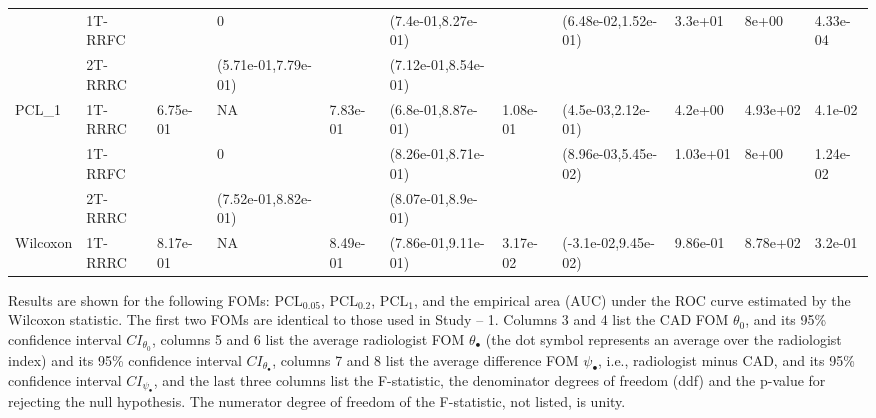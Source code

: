 \documentclass[
]{article}
\begin{document}
\begin{table}[H]
{\begin{tabular}[t]{lllllllllll}
\cmidrule{1-11}
 & 1T-RRFC &  & 0 &  & (7.4e-01,8.27e-01) &  & (6.48e-02,1.52e-01) & 3.3e+01 & 8e+00 & 4.33e-04\\
\cmidrule{2-2}
\cmidrule{4-4}
\cmidrule{6-6}
\cmidrule{8-11}
 & 2T-RRRC &  & (5.71e-01,7.79e-01) &  & (7.12e-01,8.54e-01) &  &  &  &  & \\
\cmidrule{2-2}
\cmidrule{4-4}
\cmidrule{6-6}
\multirow{-3}{*}{\raggedright\arraybackslash PCL\_1} & 1T-RRRC & \multirow{-3}{*}{\raggedright\arraybackslash 6.75e-01} & NA & \multirow{-3}{*}{\raggedright\arraybackslash 7.83e-01} & (6.8e-01,8.87e-01) & \multirow{-3}{*}{\raggedright\arraybackslash 1.08e-01} & \multirow{-2}{*}{\raggedright\arraybackslash (4.5e-03,2.12e-01)} & \multirow{-2}{*}{\raggedright\arraybackslash 4.2e+00} & \multirow{-2}{*}{\raggedright\arraybackslash 4.93e+02} & \multirow{-2}{*}{\raggedright\arraybackslash 4.1e-02}\\
\cmidrule{1-11}
 & 1T-RRFC &  & 0 &  & (8.26e-01,8.71e-01) &  & (8.96e-03,5.45e-02) & 1.03e+01 & 8e+00 & 1.24e-02\\
\cmidrule{2-2}
\cmidrule{4-4}
\cmidrule{6-6}
\cmidrule{8-11}
 & 2T-RRRC &  & (7.52e-01,8.82e-01) &  & (8.07e-01,8.9e-01) &  &  &  &  & \\
\cmidrule{2-2}
\cmidrule{4-4}
\cmidrule{6-6}
\multirow{-3}{*}{\raggedright\arraybackslash Wilcoxon} & 1T-RRRC & \multirow{-3}{*}{\raggedright\arraybackslash 8.17e-01} & NA & \multirow{-3}{*}{\raggedright\arraybackslash 8.49e-01} & (7.86e-01,9.11e-01) & \multirow{-3}{*}{\raggedright\arraybackslash 3.17e-02} & \multirow{-2}{*}{\raggedright\arraybackslash (-3.1e-02,9.45e-02)} & \multirow{-2}{*}{\raggedright\arraybackslash 9.86e-01} & \multirow{-2}{*}{\raggedright\arraybackslash 8.78e+02} & \multirow{-2}{*}{\raggedright\arraybackslash 3.2e-01}\\
\bottomrule
\end{tabular}}
\end{table}

Results are shown for the following FOMs: \(\text{PCL}_{0.05}\), \(\text{PCL}_{0.2}\), \(\text{PCL}_{1}\), and the empirical area (AUC) under the ROC curve estimated by the Wilcoxon statistic. The first two FOMs are identical to those used in Study -- 1. Columns 3 and 4 list the CAD FOM \(\theta_0\), and its 95\% confidence interval \(CI_{\theta_0}\), columns 5 and 6 list the average radiologist FOM \(\theta_{\bullet}\) (the dot symbol represents an average over the radiologist index) and its 95\% confidence interval \(CI_{\theta_{\bullet}}\), columns 7 and 8 list the average difference FOM \(\psi_{\bullet}\), i.e., radiologist minus CAD, and its 95\% confidence interval \(CI_{\psi_{\bullet}}\), and the last three columns list the F-statistic, the denominator degrees of freedom (ddf) and the p-value for rejecting the null hypothesis. The numerator degree of freedom of the F-statistic, not listed, is unity.
\end{document}
